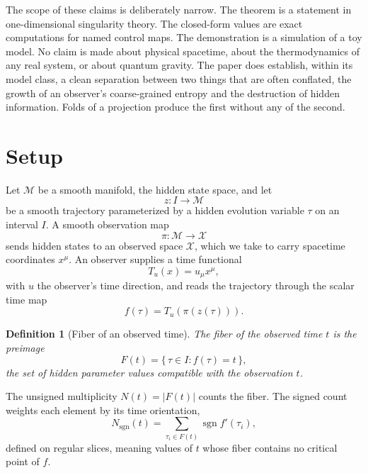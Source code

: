 \documentclass[aps,pre,reprint,nofootinbib]{revtex4-2}
\newtheorem{definition}{Definition}
\newcommand{\M}{\mathcal{M}}
\newcommand{\X}{\mathcal{X}}
\begin{document}
The scope of these claims is deliberately narrow.  The theorem is a
statement in one-dimensional singularity theory.  The closed-form values are
exact computations for named control maps.  The demonstration is a
simulation of a toy model.  No claim is made about physical spacetime, about
the thermodynamics of any real system, or about quantum gravity.  The paper
does establish, within its model class, a clean separation between two
things that are often conflated, the growth of an observer's coarse-grained
entropy and the destruction of hidden information.  Folds of a projection
produce the first without any of the second.

\section{Setup}
\label{sec:setup}

Let $\M$ be a smooth manifold, the hidden state space, and let
\begin{equation}
  z: I \rightarrow \M
\end{equation}
be a smooth trajectory parameterized by a hidden evolution variable $\tau$
on an interval $I$.  A smooth observation map
\begin{equation}
  \pi: \M \rightarrow \X
\end{equation}
sends hidden states to an observed space $\X$, which we take to carry
spacetime coordinates $x^\mu$.  An observer supplies a time functional
\begin{equation}
  T_u(x) = u_\mu x^\mu,
\end{equation}
with $u$ the observer's time direction, and reads the trajectory through
the scalar time map
\begin{equation}
  f(\tau) = T_u\!\left(\pi(z(\tau))\right).
  \label{eq:timemap}
\end{equation}

\begin{definition}[Fiber of an observed time]
The fiber of the observed time $t$ is the preimage
\begin{equation}
  F(t) = \{\, \tau \in I : f(\tau) = t \,\},
\end{equation}
the set of hidden parameter values compatible with the observation $t$.
\end{definition}

The unsigned multiplicity $N(t) = |F(t)|$ counts the fiber.  The signed
count weights each element by its time orientation,
\begin{equation}
  N_{\mathrm{sgn}}(t)
  = \sum_{\tau_i \in F(t)} \operatorname{sgn} f'(\tau_i),
  \label{eq:signed}
\end{equation}
defined on regular slices, meaning values of $t$ whose fiber contains no
critical point of $f$.
\end{document}
